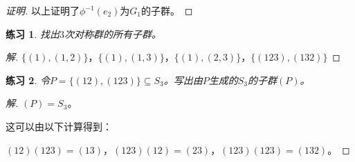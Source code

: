 \documentclass{article}
\newtheorem{Exercise}{练习}
\begin{document}
\begin{CJK*}{UTF8}{gbsn}
\begin{proof}[证明]
以上证明了$\phi^{-1}(e_2)$为$G_1$的子群。
\end{proof}
\begin{Exercise}
  找出$3$次对称群的所有子群。
\end{Exercise}
\begin{proof}[解]
  $\{(1),(1,2)\}$，$\{(1),(1,3)\}$，$\{(1),(2,3)\}$，$\{(123),(132)\}$
\end{proof}

\begin{Exercise}
  令$P=\{(12),(123)\}\subseteq S_3$。写出由$P$生成的$S_3$的子群$(P)$。
\end{Exercise}
\begin{proof}[解]
  $(P)=S_3$。

  这可以由以下计算得到：

  $(12)(123)=(13)$，$(123)(12)=(23)$，$(123)(123)=(132)$。
\end{proof}
\end{CJK*}
\end{document}
